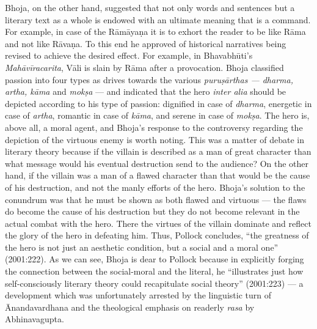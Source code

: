 Bhoja, on the other hand, suggested that not only words and sentences but a literary text as a whole is endowed with an ultimate meaning that is a command. For example, in case of the Rāmāyaṇa it is to exhort the reader to be like Rāma and not like Rāvaṇa. To this end he approved of historical narratives being revised to achieve the desired effect. For example, in Bhavabhūti's {\sl Mahāvīracarita}, Vāli is slain by Rāma after a provocation. Bhoja classified passion into four types as drives towards the various {\sl puruṣārthas --- dharma, artha, kāma} and {\sl mokṣa} --- and indicated that the hero {\sl inter alia} should be depicted according to his type of passion: dignified in case of {\sl dharma}, energetic in case of {\sl artha}, romantic in case of {\sl kāma}, and serene in case of {\sl mokṣa}. The hero is, above all, a moral agent, and Bhoja's response to the controversy regarding the depiction of the virtuous enemy is worth noting. This was a matter of debate in literary theory because if the villain is described as a man of great character than what message would his eventual destruction send to the audience? On the other hand, if the villain was a man of a flawed character than that would be the cause of his destruction, and not the manly efforts of the hero. Bhoja's solution to the conundrum was that he must be shown as both flawed and virtuous --- the flaws do become the cause of his destruction but they do not become relevant in the actual combat with the hero. There the virtues of the villain dominate and reflect the glory of the hero in defeating him. Thus, Pollock concludes, ``the greatness of the hero is not just an aesthetic condition, but a social and a moral one'' (2001:222). As we can see, Bhoja is dear to Pollock because in explicitly forging the connection between the social-moral and the literal, he ``illustrates just how self-consciously literary theory could recapitulate social theory'' (2001:223) --- a development which was unfortunately arrested by the linguistic turn of Ānandavardhana and the theological emphasis on readerly {\sl rasa} by Abhinavagupta.

